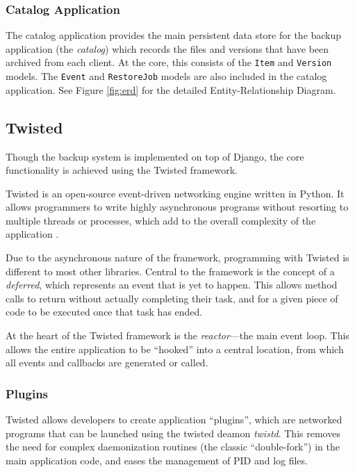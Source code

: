 \subsubsection{Catalog Application}

The catalog application provides the main persistent data store for the backup
application (the \emph{catalog}) which records the files and versions that have
been archived from each client. At the core, this consists of the \verb!Item!
and \verb!Version! models. The \verb!Event! and \verb!RestoreJob! models are
also included in the catalog application. See Figure \ref{fig:erd} for the
detailed Entity-Relationship Diagram.

\subsection{Twisted}

Though the backup system is implemented on top of Django, the core
functionality is achieved using the Twisted framework.

Twisted is an open-source event-driven networking engine written in Python. It
allows programmers to write highly asynchronous programs without resorting to
multiple threads or processes, which add to the overall complexity of the
application \cite{kinder2005}.

Due to the asynchronous nature of the framework, programming with Twisted is
different to most other libraries. Central to the framework is the concept of
a \emph{deferred}, which represents an event that is yet to happen. This allows
method calls to return without actually completing their task, and for a given
piece of code to be executed once that task has ended.

At the heart of the Twisted framework is the \emph{reactor}---the main event
loop. This allows the entire application to be ``hooked'' into a central
location, from which all events and callbacks are generated or called.

\subsubsection{Plugins}

Twisted allows developers to create application ``plugins'', which are
networked programs that can be launched using the twisted deamon \emph{twistd}.
This removes the need for complex daemonization routines (the classic
``double-fork'') in the main application code, and eases the management of PID
and log files.

